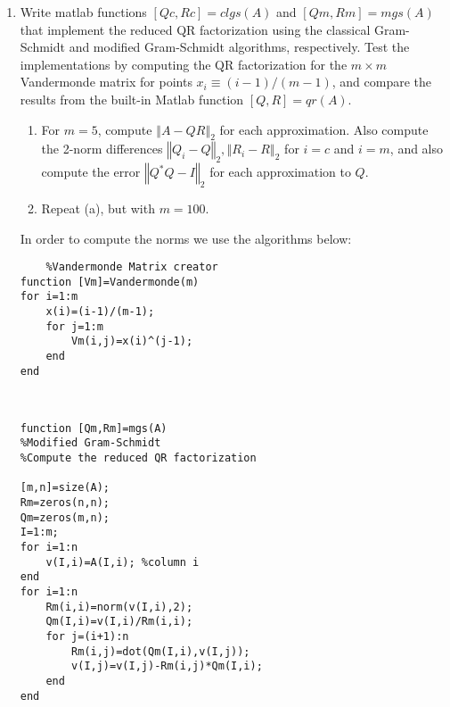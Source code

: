 \documentclass[12pt]{article}
\numberwithin{equation}{section}
\newcommand{\norm}[1]{\left\Vert#1\right\Vert}
\newenvironment{proof}[1][Proof]{\textbf{#1.} }{\ \rule{0.5em}{0.5em}}
\begin{document}
\begin{enumerate}
\begin{enumerate}
        $rank(A)\geq k$\\
        \begin{proof}
        Following the same logic as the proof above, the number of independent columns of $A$ can be determined by the null space of $A$.
        $$Ax=0\implies QRx=0\implies Rx=0$$
        Since $R$ has $k$ nonzero diagonal entries, we know that the dimension of the null space of $A$ can be equal to $n-k$. Thus A would have $n-(n-k)=k$ independent columns.
        We look at the matrix
        $$A=\left[\begin{array}{cc}0&1\\0&0\end{array}\right]$$. We know $rank(A)=1$, but $r_{11}=r_{22}=0$. Therefore, $rank(A)\geq k$.
        \end{proof}
        \end{enumerate}
\item Write matlab functions $[Qc,Rc]=clgs(A)$ and $[Qm,Rm]=mgs(A)$ that implement the reduced QR factorization using the classical Gram-Schmidt and modified Gram-Schmidt algorithms, respectively. Test the implementations by computing the QR factorization for the $m\times m$ Vandermonde matrix for points $x_i\equiv(i-1)/(m-1)$, and compare the results from the built-in Matlab function $[Q,R]=qr(A).$
    \begin{enumerate} \item For $m=5$, compute $\norm{A-QR}_2$ for each approximation. Also compute the 2-norm differences $\norm{Q_i-Q}_2,\norm{R_i-R}_2$ for $i=c$ and $i=m$, and also compute the error $\norm{Q^*Q-I}_2$ for each approximation to $Q$.
    \item Repeat (a), but with $m=100$.
    \end{enumerate}
    In order to compute the norms we use the algorithms below:
    \begin{lstlisting}
    %Vandermonde Matrix creator
function [Vm]=Vandermonde(m)
for i=1:m
    x(i)=(i-1)/(m-1);
    for j=1:m
        Vm(i,j)=x(i)^(j-1);
    end
end
\end{lstlisting}
\begin{lstlisting}


function [Qm,Rm]=mgs(A)
%Modified Gram-Schmidt
%Compute the reduced QR factorization

[m,n]=size(A);
Rm=zeros(n,n);
Qm=zeros(m,n);
I=1:m;
for i=1:n
    v(I,i)=A(I,i); %column i
end
for i=1:n
    Rm(i,i)=norm(v(I,i),2);
    Qm(I,i)=v(I,i)/Rm(i,i);
    for j=(i+1):n
        Rm(i,j)=dot(Qm(I,i),v(I,j));
        v(I,j)=v(I,j)-Rm(i,j)*Qm(I,i);
    end
end


\end{lstlisting}
\end{enumerate}
\end{document}
